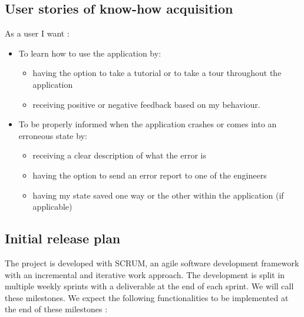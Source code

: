 \documentclass{article}
\begin{document}
    \subsection{User stories of know-how acquisition} 
    
    As a user I want : 
    
    \begin{itemize}
        \item To learn how to use the application by:
            \begin{itemize}
                \item having the option to take a tutorial or to take a tour throughout the application
                \item receiving positive or negative feedback based on my behaviour.
            \end{itemize}
        \item To be properly informed when the application crashes or comes into an erroneous state by:
            \begin{itemize}
               \item receiving a clear description of what the error is
               \item having the option to send an error report to one of the engineers
               \item having my state saved one way or the other within the application (if applicable)
            \end{itemize}
    \end{itemize}
    
    
    \subsection{Initial release plan}
    
    The project is developed with SCRUM, an agile software development framework with an incremental and iterative work approach. The development is split in multiple weekly sprints with a deliverable at the end of each sprint. We will call these milestones. We expect the following functionalities to be implemented at the end of these milestones :
    \\
    
\end{document}
